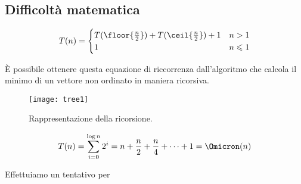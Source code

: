 \subsection*{Difficoltà matematica}

\[
T(n) =
	\begin{cases}
	T(\floor{ \frac{n}{2} }) + T(\ceil{ \frac{n}{2} }) + 1 & n > 1 \\
	1 & n \leqslant 1
	\end{cases}
\]

\begin{note}
\`{E} possibile ottenere questa equazione di riccorrenza dall'algoritmo che calcola il minimo di un vettore non ordinato in maniera ricorsiva.
\end{note}

\begin{figure}[H]
	\centering
	\texttt{[image: tree1]}
	\caption[]{Rappresentazione della ricorsione.}
\end{figure}

\[
	T(n) = \sum_{i=0}^{\log n} 2^i = n + \frac{n}{2} + \frac{n}{4} + \cdots + 1 = \Omicron(n)
\]

Effettuiamo un tentativo per 

